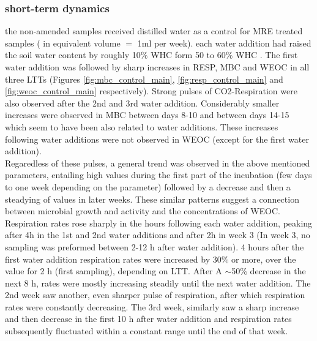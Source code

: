 		\subsubsection{short-term dynamics}

			the non-amended samples received distilled water as a control for MRE treated samples ( in equivalent volume $=$ 1ml per week).
			each water addition had raised the soil water content by roughly 10$\%$ WHC form 50 to 60$\%$ WHC .
			The first water addition was followed by sharp increases in RESP, MBC and  WEOC in all three LTTs (Figures \ref{fig:mbc_control_main}, \ref{fig:resp_control_main} and \ref{fig:weoc_control_main} respectively). Strong pulses of CO2-Respiration were also observed after the 2nd and 3rd water addition. Considerably smaller increases were observed in MBC between days 8-10 and between days 14-15 which seem to have been also related to water additions. These increases following water additions were not observed in WEOC (except for the first water addition). \\
			Regaredless of these pulses, a general trend was observed in the above mentioned parameters, entailing high values during the first part of the incubation (few days to one week depending on the parameter) followed by a decrease and then a steadying of values in later weeks. These similar patterns suggest a connection between microbial growth and activity and the concentrations of WEOC. \\
			Respiration rates rose sharply in the hours following each water addition, peaking after 4h in the 1st and 2nd water additions and after 2h in week 3 (In week 3, no sampling was preformed between 2-12 h after water addition). 4 hours after the first water addition respiration rates were increased by 30$\%$ or more, over the value for 2 h (first sampling), depending on LTT. After A $ \sim $50$\%$ decrease in the next 8 h, rates were mostly  increasing  steadily until the next water addition. The 2nd week saw another, even sharper pulse of respiration, after which respiration rates were constantly decreasing. The 3rd week, similarly saw a sharp increase and then decrease in the first 10 h after water addition and respiration rates subsequently fluctuated within a constant range until the end of that week.\\

